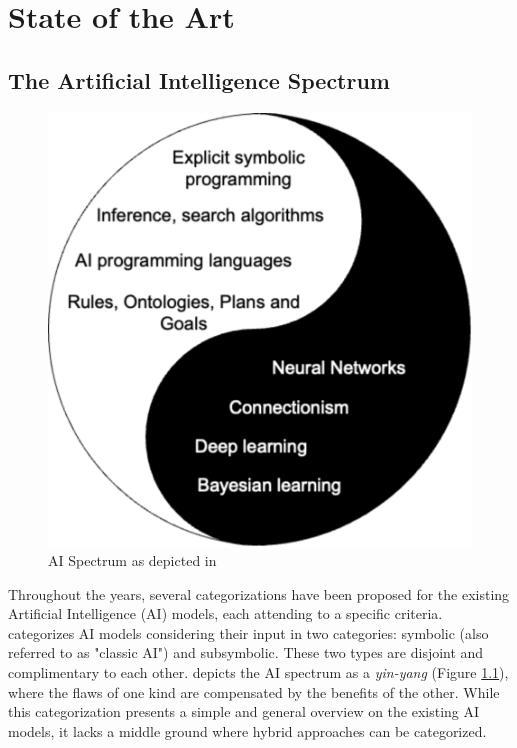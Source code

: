 \chapter{State of the Art}
\label{chap:soa}

\section{The Artificial Intelligence Spectrum}

\begin{figure}
    \centering
    \includegraphics[width=.5\linewidth]{3_stateoftheart/figures/Lieberman_taxonomy.eps}
    \caption{AI Spectrum as depicted in \cite{lieberman_symbolic_nodate}}
    \label{fig:lieberman_tax}
\end{figure}

Throughout the years, several categorizations have been proposed for the existing Artificial Intelligence (AI) models, each attending to a specific criteria. \cite{lieberman_symbolic_nodate} categorizes AI models considering their input in two categories: symbolic (also referred to as "classic AI") and subsymbolic. These two types are disjoint and complimentary to each other. \cite{lieberman_symbolic_nodate} depicts the AI spectrum as a \textit{yin-yang} (Figure \ref{fig:lieberman_tax}), where the flaws of one kind are compensated by the benefits of the other. While this categorization presents a simple and general overview on the existing AI models, it lacks a middle ground where hybrid approaches can be categorized. 

